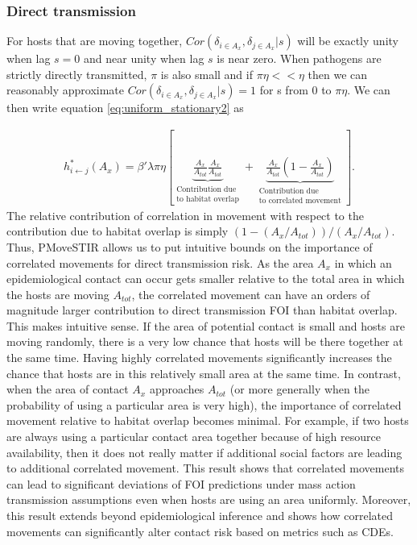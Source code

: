 \documentclass[letterpaper]{article}
\begin{document}
\subsubsection*{Direct transmission}

For hosts that are moving together, $Cor(\delta_{i \in A_x}, \delta_{j \in A_x} | s)$ will be exactly unity when lag $s = 0$ and near unity when lag $s$ is near zero. When pathogens are strictly directly transmitted, $\pi$ is also small and if $\pi \eta << \eta$ then we can reasonably approximate $Cor(\delta_{i \in A_x}, \delta_{j \in A_x} | s) = 1$ for s from 0 to $\pi \eta$.  We can then write equation \ref{eq:uniform_stationary2} as 

\begin{equation}
    \begin{aligned}
        h^*_{i \leftarrow j}(A_x) = \beta' \lambda \pi \eta \left[\underbrace{\frac{A_x}{A_{tot}}\frac{A_x}{A_{tot}}}_{\substack{\text{Contribution due} \\  \text{to habitat overlap}}} + \underbrace{\frac{A_x}{A_{tot}}(1 - \frac{A_x}{A_{tot}})}_{\substack{\text{Contribution due} \\ \text{to correlated movement}}} \right].
    \end{aligned}
    \label{eq:uniform_direct}
\end{equation}
The relative contribution of correlation in movement with respect to the contribution due to habitat overlap is simply $(1 - (A_x / A_{tot})) / (A_x / A_{tot})$. 
Thus, PMoveSTIR allows us to put intuitive bounds on the importance of correlated movements for direct transmission risk. 
As the area $A_x$ in which an epidemiological contact can occur gets smaller relative to the total area in which the hosts are moving $A_{tot}$, the correlated movement can have an orders of magnitude larger contribution to direct transmission FOI than habitat overlap. 
This makes intuitive sense. If the area of potential contact is small and hosts are moving randomly, there is a very low chance that hosts will be there together at the same time.  Having highly correlated movements significantly increases the chance that hosts are in this relatively small area at the same time.  
In contrast, when the area of contact $A_x$ approaches $A_{tot}$ (or more generally when the probability of using a particular area is very high), the importance of correlated movement relative to habitat overlap becomes minimal. For example, if two hosts are always using a particular contact area together because of high resource availability, then it does not really matter if additional social factors are leading to additional correlated movement. 
This result shows that correlated movements can lead to significant deviations of FOI predictions under mass action transmission assumptions even when hosts are using an area uniformly.  Moreover, this result extends beyond epidemiological inference and shows how correlated movements can significantly alter contact risk based on metrics such as CDEs.
\end{document}
